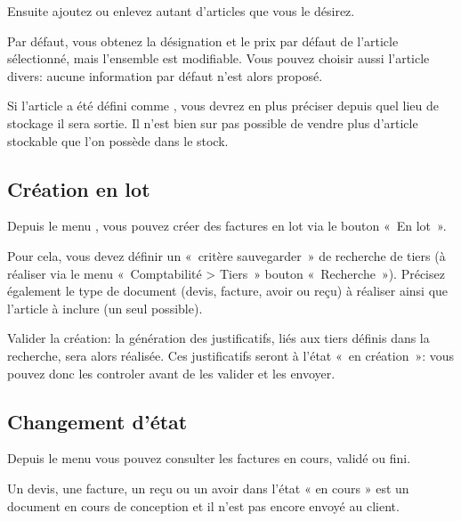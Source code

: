 \documentclass[a4paper,10pt,oneside,french]{sphinxmanual}
\begin{document}
\sphinxAtStartPar
Ensuite ajoutez ou enlevez autant d’articles que vous le désirez.
\begin{quote}

\noindent{}
\end{quote}

\sphinxAtStartPar
Par défaut, vous obtenez la désignation et le prix par défaut de l’article sélectionné, mais l’ensemble est modifiable. Vous pouvez choisir aussi l’article divers: aucune information par défaut n’est alors proposé.

\sphinxAtStartPar
Si l’article a été défini comme , vous devrez en plus préciser depuis quel lieu de stockage il sera sortie.
Il n’est bien sur pas possible de vendre plus d’article stockable que l’on possède dans le stock.


\subsection{Création en lot}
\label{\detokenize{invoice/create_bill:creation-en-lot}}
\sphinxAtStartPar
Depuis le menu , vous pouvez créer des factures en lot via le bouton « En lot ».

\sphinxAtStartPar
Pour cela, vous devez définir un « critère sauvegarder » de recherche de tiers (à réaliser via le menu « Comptabilité \textgreater{} Tiers » \sphinxhyphen{} bouton « Recherche »).
Précisez également le type de document (devis, facture, avoir ou reçu) à réaliser ainsi que l’article à inclure (un seul possible).

\sphinxAtStartPar
Valider la création: la génération des justificatifs, liés aux tiers définis dans la recherche, sera alors réalisée.
Ces justificatifs seront à l’état « en création »: vous pouvez donc les controler avant de les valider et les envoyer.


\subsection{Changement d’état}
\label{\detokenize{invoice/create_bill:changement-d-etat}}
\sphinxAtStartPar
Depuis le menu  vous pouvez consulter les factures en cours, validé ou fini.

\sphinxAtStartPar
Un devis, une facture, un reçu ou un avoir dans l’état « en cours » est un document en cours de conception et il n’est pas encore envoyé au client.
\end{document}
